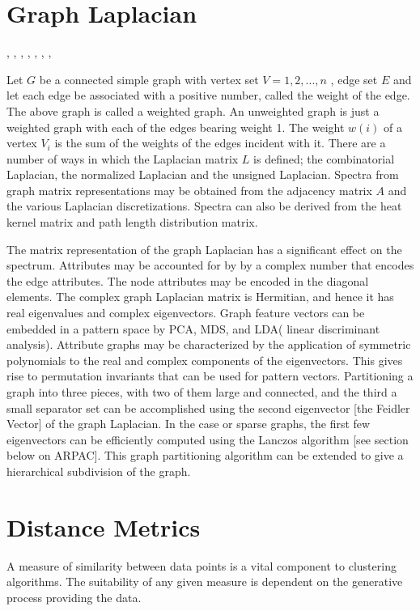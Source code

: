 \documentclass[a4paper]{article}
\theoremstyle{plain}
\theoremstyle{definition}
\theoremstyle{remark}
\numberwithin{equation}{section}
\begin{document}
\section{Graph Laplacian}
\cite{GLPBoydconvexoptimization}, \cite{GLPChung93laplaciansof}, \cite{GLPCrescenzi96toweight},
\cite{GLPGuatterygraphembeddings}, \cite{GLPBoydconvexoptimization},
\cite{GLPChung93laplaciansof},
\cite{GLPSpectralAnalysisComplexLaplacianMatrices}, \cite{GLPKellersignedgraph}

Let $G$ be a connected simple graph with vertex set $V = {1, 2, ... , n}$ , edge set $E$ and let each edge be associated with a positive number, called the weight of the edge. The above graph is called a weighted graph. An unweighted graph is just a weighted graph with each of the edges bearing weight 1.  The weight $w(i)$ of a vertex $V_i$ is the sum of the weights of the edges incident with it. There are a number of ways in which the  Laplacian matrix $L$ is defined; the combinatorial Laplacian, the normalized Laplacian and the unsigned Laplacian.  Spectra from graph matrix representations may be obtained from the adjacency matrix $A$ and the various Laplacian discretizations.  Spectra can also be derived from the heat kernel matrix and path length distribution matrix.

The matrix representation of the graph Laplacian has a significant effect on the spectrum.  Attributes may be accounted for by by a complex number that encodes the edge attributes.  The node attributes may be encoded in the diagonal elements.   The complex graph Laplacian matrix is Hermitian, and hence it has real eigenvalues and complex eigenvectors.  Graph feature vectors can be embedded in a pattern space by PCA, MDS, and LDA( linear discriminant analysis).  Attribute graphs may be characterized by the application of symmetric polynomials to the real and complex components of the eigenvectors. \cite{GLPAnaFred} This gives rise to permutation invariants that can be used for pattern vectors.  Partitioning a graph into three pieces, with two of them large and connected, and the third a small separator set can be accomplished using the second eigenvector [the Feidler Vector] of the graph Laplacian.  In the case or sparse graphs, the first few eigenvectors can be efficiently computed using the Lanczos algorithm [see section below on ARPAC].  This graph partitioning algorithm can be extended to give a hierarchical subdivision of the graph.


\section{Distance Metrics}
A measure of similarity between data points is a vital component to clustering algorithms.  The suitability of any given measure is dependent on the generative process providing the data.
\end{document}
